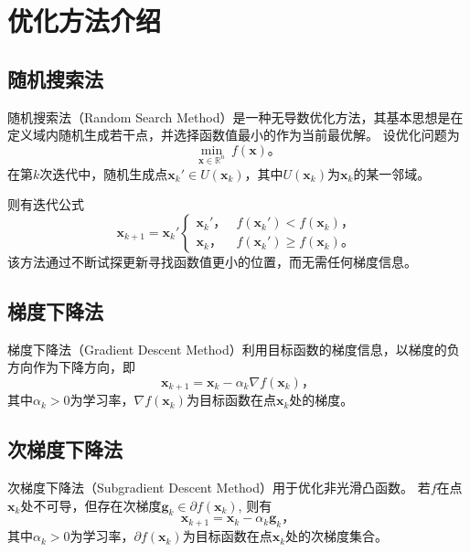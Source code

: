 \section{优化方法介绍}

\subsection{随机搜索法}

随机搜索法（Random Search Method）是一种无导数优化方法，其基本思想是在定义域内随机生成若干点，并选择函数值最小的作为当前最优解。
设优化问题为
\begin{equation*}
    \min_{\bm{x}\in\mathbb{R}^n} ~ f(\bm{x}) \text{。}
\end{equation*}
在第$k$次迭代中，随机生成点$\bm{x}_k'\in U(\bm{x}_k)$，其中$U(\bm{x}_k)$为$\bm{x}_k$的某一邻域。

则有迭代公式
\begin{equation*}
    \bm{x}_{k+1}=\bm{x}_k'
    \begin{cases}
        \bm{x}_k'\text{，} &f(\bm{x}_k')<f(\bm{x}_k) \text{，} \\
        \bm{x}_k\text{，} &f(\bm{x}_k')\geq f(\bm{x}_k) \text{。}
    \end{cases}
\end{equation*}
该方法通过不断试探更新寻找函数值更小的位置，而无需任何梯度信息。

\subsection{梯度下降法}

梯度下降法（Gradient Descent Method）利用目标函数的梯度信息，以梯度的负方向作为下降方向，即
\begin{equation*}
    \bm{x}_{k+1}=\bm{x}_k-\alpha_k\nabla f(\bm{x}_k) \text{，}
\end{equation*}
其中$\alpha_k>0$为学习率，$\nabla f(\bm{x}_k)$为目标函数在点$\bm{x}_k$处的梯度。

\subsection{次梯度下降法}

次梯度下降法（Subgradient Descent Method）用于优化非光滑凸函数。
若$f$在点$\bm{x}_k$处不可导，但存在次梯度$\bm{g}_k\in\partial f(\bm{x}_k)$, 则有
\begin{equation*}
    \bm{x}_{k+1}=\bm{x}_k-\alpha_k\bm{g}_k \text{，}
\end{equation*}
其中$\alpha_k>0$为学习率，$\partial f(\bm{x}_k)$为目标函数在点$\bm{x}_k$处的次梯度集合。

